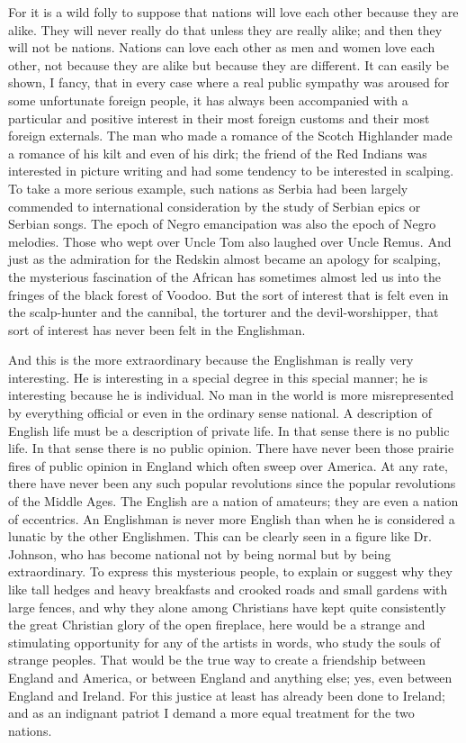 \documentclass{book}
\begin{document}
For it is a wild folly to suppose that nations will love each other because they are alike. They will never really do that unless they are really alike; and then they will not be nations. Nations can love each other as men and women love each other, not because they are alike but because they are different. It can easily be shown, I fancy, that in every case where a real public sympathy was aroused for some unfortunate foreign people, it has always been accompanied with a particular and positive interest in their most foreign customs and their most foreign externals. The man who made a romance of the Scotch Highlander made a romance of his kilt and even of his dirk; the friend of the Red Indians was interested in picture writing and had some tendency to be interested in scalping. To take a more serious example, such nations as Serbia had been largely commended to international consideration by the study of Serbian epics or Serbian songs. The epoch of Negro emancipation was also the epoch of Negro melodies. Those who wept over Uncle Tom also laughed over Uncle Remus. And just as the admiration for the Redskin almost became an apology for scalping, the mysterious fascination of the African has sometimes almost led us into the fringes of the black forest of Voodoo. But the sort of interest that is felt even in the scalp-hunter and the cannibal, the torturer and the devil-worshipper, that sort of interest has never been felt in the Englishman.

And this is the more extraordinary because the Englishman is really very interesting. He is interesting in a special degree in this special manner; he is interesting because he is individual. No man in the world is more misrepresented by everything official or even in the ordinary sense national. A description of English life must be a description of private life. In that sense there is no public life. In that sense there is no public opinion. There have never been those prairie fires of public opinion in England which often sweep over America. At any rate, there have never been any such popular revolutions since the popular revolutions of the Middle Ages. The English are a nation of amateurs; they are even a nation of eccentrics. An Englishman is never more English than when he is considered a lunatic by the other Englishmen. This can be clearly seen in a figure like Dr. Johnson, who has become national not by being normal but by being extraordinary. To express this mysterious people, to explain or suggest why they like tall hedges and heavy breakfasts and crooked roads and small gardens with large fences, and why they alone among Christians have kept quite consistently the great Christian glory of the open fireplace, here would be a strange and stimulating opportunity for any of the artists in words, who study the souls of strange peoples. That would be the true way to create a friendship between England and America, or between England and anything else; yes, even between England and Ireland. For this justice at least has already been done to Ireland; and as an indignant patriot I demand a more equal treatment for the two nations.
\end{document}
